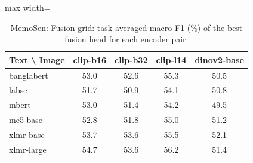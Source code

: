 \begin{table}[t]
\centering
\small
\caption{MemoSen: Fusion grid: task-averaged macro-F1 (\%) of the best fusion head for each encoder pair.}
\label{tab:grid_fine_memosen}
\begin{adjustbox}{max width=\columnwidth}
\begin{tabular}{lcccc}
\toprule
Text \textbackslash{} Image & clip-b16 & clip-b32 & clip-l14 & dinov2-base \\
\midrule
banglabert & 53.0 & 52.6 & 55.3 & 50.5 \\
labse & 51.7 & 50.9 & 54.1 & 50.8 \\
mbert & 53.0 & 51.4 & 54.2 & 49.5 \\
me5-base & 52.8 & 51.8 & 55.0 & 51.2 \\
xlmr-base & 53.7 & 53.6 & 55.5 & 52.1 \\
xlmr-large & 54.7 & 53.6 & 56.2 & 51.4 \\
\bottomrule
\end{tabular}
\end{adjustbox}
\end{table}
